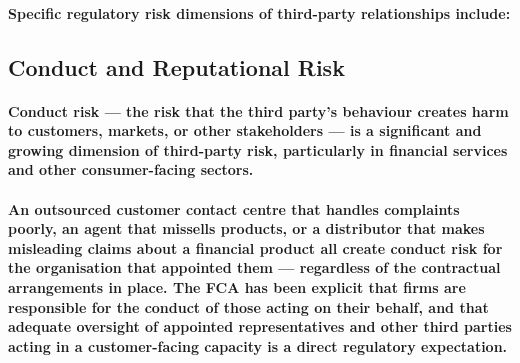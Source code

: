 \paragraph{Specific regulatory risk dimensions of third-party relationships include:}
\begin{itemize}
\end{itemize}

\subsection{Conduct and Reputational Risk}
\paragraph{\textbf{Conduct risk} — the risk that the third party's behaviour creates harm to customers, markets, or other stakeholders — is a significant and growing dimension of third-party risk, particularly in financial services and other consumer-facing sectors.}
\paragraph{An outsourced customer contact centre that handles complaints poorly, an agent that missells products, or a distributor that makes misleading claims about a financial product all create conduct risk for the organisation that appointed them — regardless of the contractual arrangements in place. The FCA has been explicit that firms are responsible for the conduct of those acting on their behalf, and that adequate oversight of appointed representatives and other third parties acting in a customer-facing capacity is a direct regulatory expectation.}
